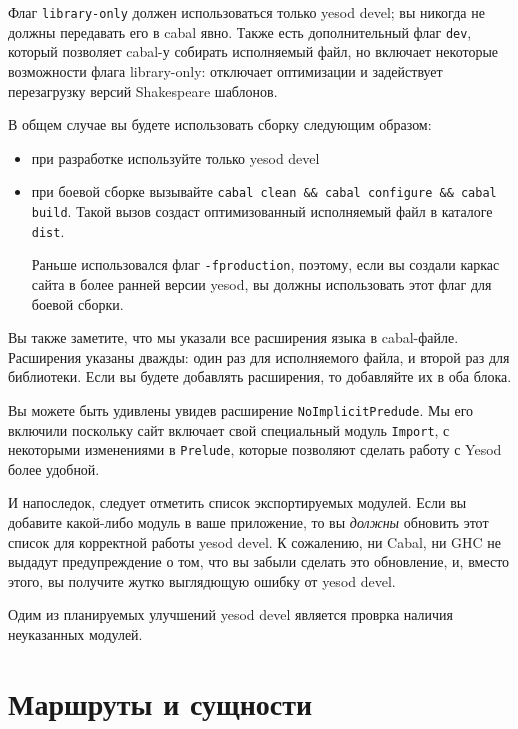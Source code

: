 Флаг \lstinline!library-only! должен использоваться только yesod devel; вы никогда не должны
передавать его в cabal явно. Также есть дополнительный флаг \lstinline!dev!, который позволяет
cabal-у собирать исполняемый файл, но включает некоторые возможности флага library-only:
отключает оптимизации и задействует перезагрузку версий Shakespeare шаблонов.

В общем случае вы будете использовать сборку следующим образом:
\begin{itemize}
  \item при разработке используйте только yesod devel
  \item при боевой сборке вызывайте \lstinline!cabal clean && cabal configure && cabal build!. Такой вызов
    создаст оптимизованный исполняемый файл в каталоге \lstinline!dist!.
    \begin{remark}
      Раньше использовался флаг \lstinline!-fproduction!, поэтому, если вы создали каркас сайта в более ранней
      версии yesod, вы должны использовать этот флаг для боевой сборки.
    \end{remark}
\end{itemize}

Вы также заметите, что мы указали все расширения языка в cabal-файле. Расширения указаны дважды:
один раз для исполняемого файла, и второй раз для библиотеки. Если вы будете добавлять расширения, то
добавляйте их в оба блока.

Вы можете быть удивлены увидев расширение \lstinline!NoImplicitPredude!. Мы его включили поскольку сайт 
включает свой специальный модуль \lstinline!Import!, с некоторыми изменениями в \lstinline!Prelude!, которые
позволяют сделать работу с Yesod более удобной.

И напоследок, следует отметить список экспортируемых модулей. Если вы добавите какой-либо модуль в 
ваше приложение, то вы \emph{должны} обновить этот список для корректной работы yesod devel. К сожалению,
ни Cabal, ни GHC не выдадут предупреждение о том, что вы забыли сделать это обновление, и, вместо этого,
вы получите жутко выглядющую ошибку от yesod devel.
\begin{remark}
  Одим из планируемых улучшений yesod devel является проврка наличия неуказанных модулей.
\end{remark}

\section{Маршруты и сущности}

